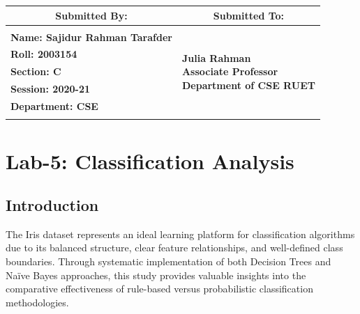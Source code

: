 \documentclass[12pt,a4paper]{article}
\begin{document}
\begin{titlepage}
    
    \begin{table}[h!]
    \centering
    \setlength{\arrayrulewidth}{1.5pt}
    \renewcommand{\arraystretch}{1.5}
    \begin{tabular}{|p{8.5cm}|p{6.5cm}|}
        \hline
        \multicolumn{1}{|c|}{\large \textbf{Submitted By:}} & \multicolumn{1}{c|}{\large \textbf{Submitted To:}} \\
        \hline
        & \\
        \large \textbf{Name: Sajidur Rahman Tarafder} & \multirow{5}{*}{\parbox{6.5cm}{\centering 
        \large \textbf{Julia Rahman} \\ 
        \vspace{0.2cm}
        \large \textbf{Associate Professor} \\ 
        \vspace{0.2cm}
        \large \textbf{Department of CSE RUET} \\ 
        \vspace{0.4cm}}} \\
        \large \textbf{Roll: 2003154} & \\
        \large \textbf{Section: C} & \\
        \large \textbf{Session: 2020-21} & \\
        \large \textbf{Department: CSE} & \\
        & \\
        \hline
    \end{tabular}
    \end{table}
    
    \vspace{0.5cm}
\end{titlepage}

\newpage
\thispagestyle{fancy}
\tableofcontents
\newpage

\section{ Lab-5: Classification Analysis }

\subsection{Introduction}
The Iris dataset represents an ideal learning platform for classification algorithms due to its balanced structure, clear feature relationships, and well-defined class boundaries. Through systematic implementation of both Decision Trees and Na\"{i}ve Bayes approaches, this study provides valuable insights into the comparative effectiveness of rule-based versus probabilistic classification methodologies.
\end{document}
